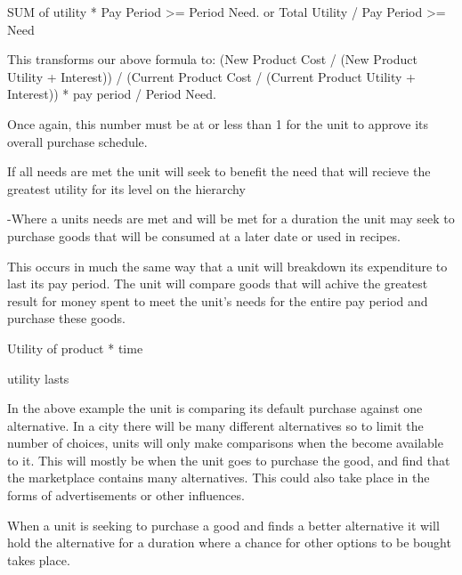 SUM of utility * Pay Period >= Period Need.
	or
Total Utility / Pay Period >= Need


This transforms our above formula to:
    (New Product Cost / (New Product Utility + Interest)) / (Current Product Cost / (Current Product Utility + Interest))
* pay period
/ Period Need.

Once again, this number must be at or less than 1 for the unit to approve its overall purchase schedule.






If all needs are met the unit will seek to benefit the need that will recieve the greatest utility for its level on the hierarchy




-Where a units needs are met and will be met for a duration the unit may seek to purchase goods that will be consumed at a later date or used in recipes.

This occurs in much the same way that a unit will breakdown its expenditure to last its pay period. The unit will compare goods that will achive the greatest result for money spent to meet the unit's needs for the entire pay period and  purchase these goods.


Utility of product * time

utility lasts 





In the above example the unit is comparing its default purchase against one alternative. In a city there will be many different alternatives so to limit the number of choices, units will only make comparisons when the become available to it. This will mostly be when the unit goes to purchase the good, and find that the marketplace contains many alternatives. This could also take place in the forms of advertisements or other influences.


When a unit is seeking to purchase a good and finds a better alternative it will hold the alternative for a duration where a chance for other options to be bought takes place.

